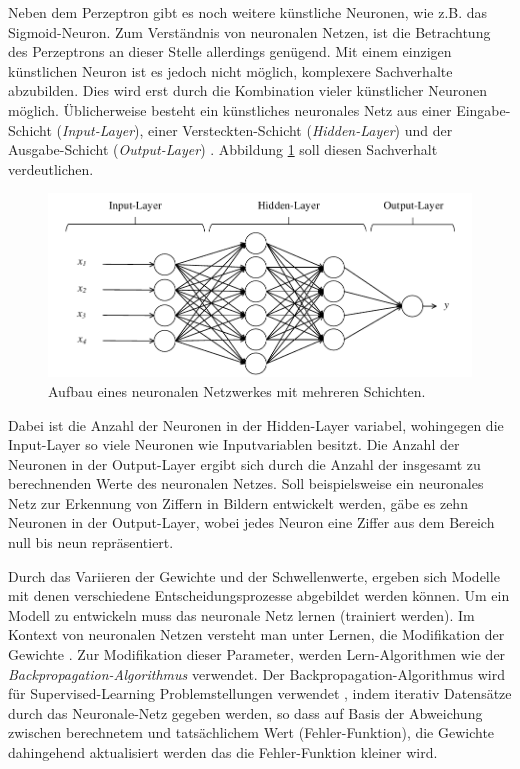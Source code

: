 Neben dem Perzeptron gibt es noch weitere künstliche Neuronen, wie z.B. das Sigmoid-Neuron. Zum Verständnis von neuronalen Netzen, ist die Betrachtung des Perzeptrons an dieser Stelle allerdings genügend. Mit einem einzigen künstlichen Neuron ist es jedoch nicht möglich, komplexere Sachverhalte abzubilden. Dies wird erst durch die Kombination vieler künstlicher Neuronen möglich. Üblicherweise besteht ein künstliches neuronales Netz aus einer Eingabe-Schicht (\emph{Input-Layer}), einer Versteckten-Schicht (\emph{Hidden-Layer}) und der Ausgabe-Schicht (\emph{Output-Layer}) \cite [vgl. S. 291]{WE16}. Abbildung \ref{fig:multilayerNN} soll diesen Sachverhalt verdeutlichen. 

\begin{figure}[ht]
\centering
\includegraphics{images/multilayerNN.pdf}
\caption{Aufbau eines neuronalen Netzwerkes mit mehreren Schichten.}
\label{fig:multilayerNN}
\end{figure}

Dabei ist die Anzahl der Neuronen in der Hidden-Layer variabel, wohingegen die Input-Layer so viele Neuronen wie Inputvariablen besitzt. Die Anzahl der Neuronen in der Output-Layer ergibt sich durch die Anzahl der insgesamt zu berechnenden Werte des neuronalen Netzes. Soll beispielsweise ein neuronales Netz zur Erkennung von Ziffern in Bildern entwickelt werden, gäbe es zehn Neuronen in der Output-Layer, wobei jedes Neuron eine Ziffer aus dem Bereich null bis neun repräsentiert.    

Durch das Variieren der Gewichte und der Schwellenwerte, ergeben sich Modelle mit denen verschiedene Entscheidungsprozesse abgebildet werden können. Um ein Modell zu entwickeln muss das neuronale Netz lernen (trainiert werden). Im Kontext von neuronalen Netzen versteht man unter Lernen, die Modifikation der Gewichte \cite {WE16}. Zur Modifikation dieser Parameter, werden Lern-Algorithmen wie der \textit{Backpropagation-Algorithmus} verwendet. Der Backpropagation-Algorithmus wird für Supervised-Learning Problemstellungen verwendet \cite [vgl. S. 89] {EA16}, indem iterativ Datensätze durch das Neuronale-Netz gegeben werden, so dass auf Basis der Abweichung zwischen berechnetem und tatsächlichem Wert (Fehler-Funktion), die Gewichte dahingehend aktualisiert werden das die Fehler-Funktion kleiner wird.           


